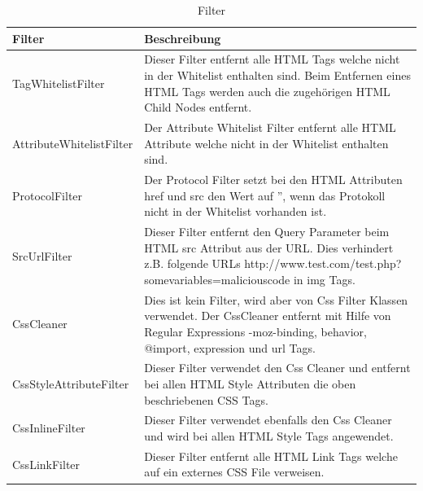 \begin{table}[h!]
\begin{center}
\begin{tabular}{l p{10.5cm} }
\hline
\textbf{Filter} & \textbf{Beschreibung} \\ \hline \hline
TagWhitelistFilter & Dieser Filter entfernt alle HTML Tags welche nicht in der Whitelist enthalten sind. 
Beim Entfernen eines HTML Tags werden auch die zugehörigen HTML Child Nodes entfernt. \\ 

AttributeWhitelistFilter & Der Attribute Whitelist Filter entfernt alle HTML Attribute welche nicht in der Whitelist enthalten sind. \\

ProtocolFilter & Der Protocol Filter setzt bei den HTML Attributen href und src den Wert auf '', wenn das Protokoll nicht in der Whitelist vorhanden ist. \\

SrcUrlFilter & Dieser Filter entfernt den Query Parameter beim HTML src Attribut aus der URL. Dies verhindert z.B. folgende URLs http://www.test.com/test.php?somevariables=maliciouscode in img Tags. \\

CssCleaner & Dies ist kein Filter, wird aber von Css Filter Klassen verwendet. Der CssCleaner entfernt mit Hilfe von Regular Expressions -moz-binding, behavior, @import, expression und url Tags. \\

CssStyleAttributeFilter & Dieser Filter verwendet den Css Cleaner und entfernt bei allen HTML Style Attributen die oben beschriebenen CSS Tags. \\

CssInlineFilter & Dieser Filter verwendet ebenfalls den Css Cleaner und wird bei allen HTML Style Tags angewendet. \\

CssLinkFilter & Dieser Filter entfernt alle HTML Link Tags welche auf ein externes CSS File verweisen. \\

\hline \hline
\end{tabular}
\caption{Filter}
\label{tab:filter}
\end{center}
\end{table}
